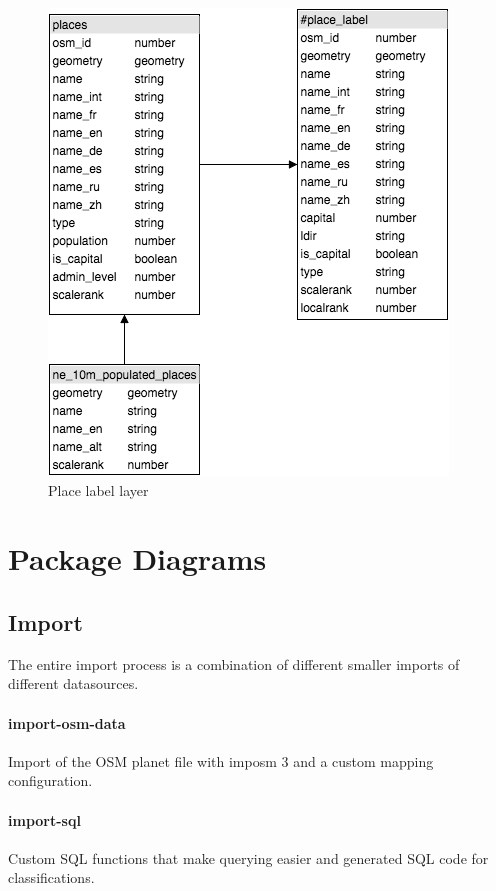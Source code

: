 \begin{figure}[h]
  \includegraphics[scale=0.6]{images/place_layer.png}
  \caption{Place label layer}
\end{figure}



\newpage
\section{Package Diagrams}

\subsection{Import}

The entire import process is a combination of different smaller imports of different datasources.

\paragraph{import-osm-data}
Import of the OSM planet file with imposm 3 and a custom mapping configuration.

\paragraph{import-sql}
Custom SQL functions that make querying easier and generated SQL code for
classifications.

